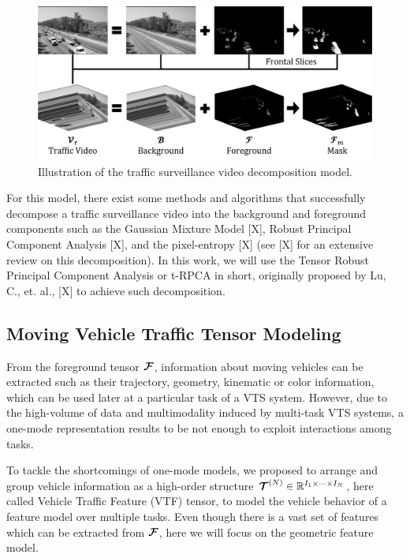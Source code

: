 \documentclass[sensors,article,submit,moreauthors,pdftex]{Definitions/mdpi}
\newcommand{\mathten}[1]{\boldsymbol{\mathbf{\mathcal{\MakeUppercase{#1}}}}}
\begin{document}
\begin{figure}[H]
\centering
\includegraphics[width=14 cm]{images/traffic-model.png}
\caption{Illustration of the traffic surveillance video decomposition model.}
\label{fig:tsvmodel}
\end{figure}

For this model, there exist some methods and algorithms that successfully decompose a traffic surveillance video into the background and foreground components such as the Gaussian Mixture Model [X], Robust Principal Component Analysis [X], and the pixel-entropy [X] (see [X] for an extensive review on this decomposition). In this work, we will use the Tensor Robust Principal Component Analysis or t-RPCA in short, originally proposed by Lu, C., et. al., [X] to achieve such decomposition.

\subsection{Moving Vehicle Traffic Tensor Modeling}

From the foreground tensor $\mathten{F}$, information about moving vehicles can be extracted such as their trajectory, geometry, kinematic or color information, which can be used later at a particular task of a VTS system. However, due to the high-volume of data and multimodality induced by multi-task VTS systems, a one-mode representation results to be not enough to exploit interactions among tasks.

To tackle the shortcomings of one-mode models, we proposed to arrange and group vehicle information as a high-order structure $\mathten{T}^{(N)} \in \mathbb{R}^{I_1 \times \cdots \times I_N}$, here called Vehicle Traffic Feature (VTF) tensor, to model the vehicle behavior of a feature model over multiple tasks. Even though there is a vast set of features which can be extracted from $\mathten{F}$, here we will focus on the geometric feature model.
\end{document}
